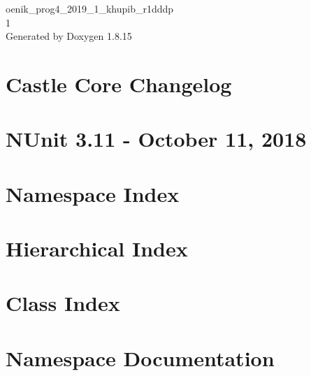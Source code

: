 \let\mypdfximage\pdfximage\def\pdfximage{\immediate\mypdfximage}\documentclass[twoside]{book}
\newcommand{\+}{\discretionary{\mbox{\scriptsize$\hookleftarrow$}}{}{}}
\newcommand{\clearemptydoublepage}{%
  \newpage{\pagestyle{empty}\cleardoublepage}%
}
\begin{document}
\hypersetup{pageanchor=false,
             bookmarksnumbered=true,
             pdfencoding=unicode
            }
\begin{titlepage}
\vspace*{7cm}
\begin{center}%
{\Large oenik\+\_\+prog4\+\_\+2019\+\_\+1\+\_\+khupib\+\_\+r1dddp \\[1ex]\large 1 }\\
\vspace*{1cm}
{\large Generated by Doxygen 1.8.15}\\
\end{center}
\end{titlepage}
\clearemptydoublepage
{}
\tableofcontents
\clearemptydoublepage
{}
\hypersetup{pageanchor=true}

\chapter{Castle Core Changelog}
\label{md_packages__castle_8_core_84_83_81__c_h_a_n_g_e_l_o_g}

\chapter{N\+Unit 3.11 -\/ October 11, 2018}
\label{md_packages__n_unit_83_811_80__c_h_a_n_g_e_s}

\chapter{Namespace Index}

\chapter{Hierarchical Index}

\chapter{Class Index}

\chapter{Namespace Documentation}






\end{document}
